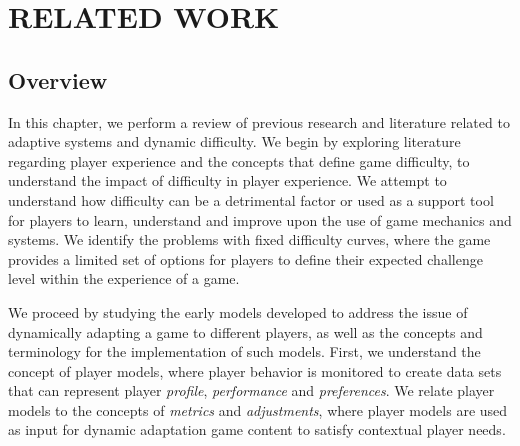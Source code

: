 \chapter{RELATED WORK}
\label{ch:related-work}



\section{Overview}

In this chapter, we perform a review of previous research and literature related to adaptive systems and dynamic difficulty. We begin by exploring literature regarding player experience and the concepts that define game difficulty, to understand the impact of difficulty in player experience. We attempt to understand how difficulty can be a detrimental factor or used as a support tool for players to learn, understand and improve upon the use of game mechanics and systems. We identify the problems with fixed difficulty curves, where the game provides a limited set of options for players to define their expected challenge level within the experience of a game. 

We proceed by studying the early models developed to address the issue of dynamically adapting a game to different players, as well as the concepts and terminology for the implementation of such models. First, we understand the concept of player models, where player behavior is monitored to create data sets that can represent player \emph{profile}, \emph{performance} and \emph{preferences}. We relate player models to the concepts of \emph{metrics} and \emph{adjustments}, where player models are used as input for dynamic adaptation game content to satisfy contextual player needs.

